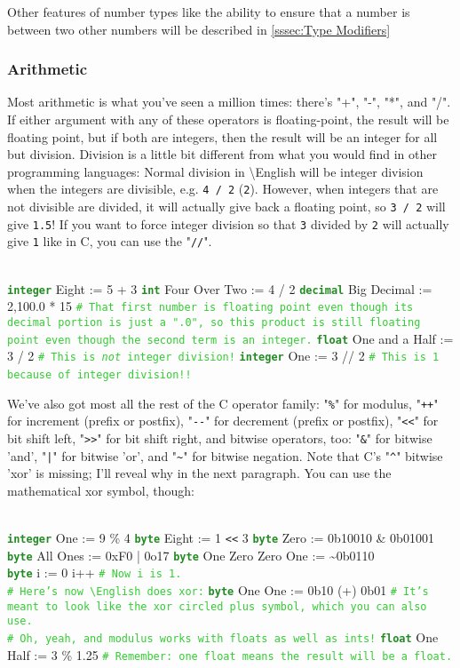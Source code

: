 \documentclass{article}
\newcommand{\English}{\textbackslash{}English}				%
\newcommand{\sssecl}[1]{\subsubsection{#1}\label{sssec:#1}}
\newcommand{\codecomment}[1]{\texttt{\textcolor{LimeGreen}{#1}}}
\newcommand{\commentline}[1]{\codecomment{\# #1}}
\newcommand{\type}[1]{\texttt{\textcolor{ForestGreen}{\textbf{#1}}}}
\newenvironment{code}[0]
{\ttfamily{}				%
\setlength\parindent{0cm}	%
~\\}
{\setlength\parindent{1cm}
~\\}
\begin{document}
\indent Other features of number types like the ability to ensure that a number is between two other numbers will be described in \ref{sssec:Type Modifiers}

\sssecl{Arithmetic}
\indent Most arithmetic is what you've seen a million times: there's "+", "-", "*", and "/". If either argument with any of these operators is floating-point, the result will be floating point, but if both are integers, then the result will be an integer for all but division. Division is a little bit different from what you would find in other programming languages:
\indent Normal division in \English{} will be integer division when the integers are divisible, e.g. \texttt{4 / 2} (\texttt{2}). However, when integers that are not divisible are divided, it will actually give back a floating point, so \texttt{3 / 2} will give \texttt{1.5}! If you want to force integer division so that \texttt{3} divided by \texttt{2} will actually give \texttt{1} like in C, you can use the "\texttt{//}".

\begin{code}
\type{integer} Eight := 5 + 3
\type{int} Four Over Two := 4 / 2
\type{decimal} Big Decimal := 2,100.0 * 15 \commentline{That first number is floating point even though its decimal portion is just a ".0", so this product is still floating point even though the second term is an integer.}
\type{float} One and a Half := 3 / 2 \commentline{This is \emph{not} integer division!}
\type{integer} One := 3 // 2 \commentline{This is 1 because of integer division!!}
\end{code}

\indent We've also got most all the rest of the C operator family: "\texttt{\%}" for modulus, "\texttt{++}" for increment (prefix or postfix), "\verb+--+" for decrement (prefix or postfix), "\verb+<<+" for bit shift left, "\verb+>>+" for bit shift right, and bitwise operators, too: "\texttt{\&}" for bitwise 'and', "\texttt{|}" for bitwise 'or', and "\texttt{\textasciitilde}" for bitwise negation.
\indent Note that C's "\texttt{\^}" bitwise 'xor' is missing; I'll reveal why in the next paragraph. You can use the mathematical xor symbol, though:

\begin{code}
\type{integer} One := 9 \% 4
\type{byte} Eight := 1 \verb+<<+ 3
\type{byte} Zero := 0b10010 \& 0b01001
\type{byte} All Ones := 0xF0 | 0o17
\type{byte} One Zero Zero One := \textasciitilde{}0b0110\\

\type{byte} i := 0
i++	\commentline{Now i is 1.}\\

\commentline{Here's now \English{} does xor:}
\type{byte} One One := 0b10 (+) 0b01 \commentline{It's meant to look like the xor circled plus symbol, which you can also use.}\\

\commentline{Oh, yeah, and modulus works with floats as well as ints!}
\type{float} One Half := 3 \% 1.25	\commentline{Remember: one float means the result will be a float.}
\end{code}
\end{document}
